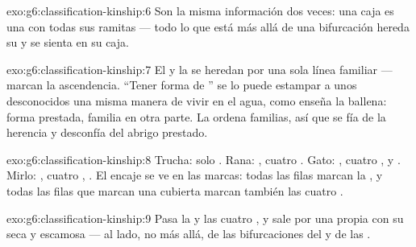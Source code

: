 \begin{solution}{exo:g6:classification-kinship:6}
Son la misma información dos veces: una caja es una  con todas sus
ramitas --- todo lo que está más allá de una bifurcación hereda su
 y se sienta en su caja.
\end{solution}

\begin{solution}{exo:g6:classification-kinship:7}
El  y la  se heredan por una sola línea familiar --- marcan la
ascendencia. ``Tener forma de '' se lo puede estampar a unos
desconocidos una misma manera de vivir en el agua, como enseña la
ballena: forma prestada, familia en otra parte. La 
ordena familias, así que se fía de la herencia y desconfía del abrigo
prestado.
\end{solution}

\begin{solution}{exo:g6:classification-kinship:8}
Trucha: solo . Rana: , cuatro
. Gato: , cuatro ,  y
. Mirlo: , cuatro , . El encaje
se ve en las marcas: todas las filas marcan la , y
todas las filas que marcan una cubierta marcan también las cuatro
.
\end{solution}

\begin{solution}{exo:g6:classification-kinship:9}
Pasa la  y las cuatro , y sale por una
 propia con su  seca y escamosa --- al lado, no más allá, de
las bifurcaciones del  y de las .
\end{solution}

